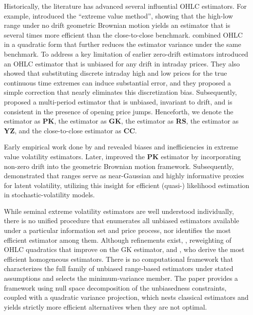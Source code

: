 Historically, the literature has advanced several influential OHLC estimators. For example, \citet{parkinson1980ExtremeValueMethod} introduced the “extreme value method”, showing that the high-low range under no drift geometric Brownian motion yields an estimator that is several times more efficient than the close-to-close benchmark. \citet{garman1980EstimationSecurityPrice} combined OHLC in a quadratic form that further reduces the estimator variance under the same benchmark. To address a key limitation of earlier zero-drift estimators \citet{rogers1991EstimatingVarianceHigh} introduced an OHLC estimator that is unbiased for any drift in intraday prices. They also showed that substituting discrete intraday high and low prices for the true continuous time extremes can induce substantial error, and they proposed a simple correction that nearly eliminates this discretization bias. Subsequently, \citet{yang2000DriftIndependentVolatilityEstimation} proposed a multi-period estimator that is unbiased, invariant to drift, and is consistent in the presence of opening price jumps. Henceforth, we denote the \citet{parkinson1980ExtremeValueMethod} estimator as \textbf{PK}, the \citet{garman1980EstimationSecurityPrice} estimator as \textbf{GK}, the \citet{rogers1991EstimatingVarianceHigh} estimator as \textbf{RS}, the \citet{yang2000DriftIndependentVolatilityEstimation} estimator as \textbf{YZ}, and the close-to-close estimator as \textbf{CC}.

Early empirical work done by \citet{beckers1983VariancesSecurityPrice} and \citet{wiggins1991EmpiricalTestsBias} revealed biases and inefficiencies in extreme value volatility estimators.  Later, \citet{kunitomo1992ImprovingParkinsonMethod} improved the \textbf{PK} estimator by incorporating non-zero drift into the geometric Brownian motion framework. Subsequently, \citet{alizadeh2002RangeBasedEstimationStochastica} demonstrated that ranges serve as  near-Gaussian and highly informative proxies for latent volatility, utilizing this insight  for efficient (quasi-) likelihood estimation in stochastic-volatility models. 

While seminal extreme volatility estimators are well understood individually, there is no unified procedure that enumerates all unbiased estimators available under a particular information set and price process, nor identifies the most efficient estimator among them. Although refinements exist, \citet{meilijson2009GarmanKlassVolatilityEstimator}, reweighting of OHLC quadratics that improve on the GK estimator, and \citet{saichev2009MostEfficientHomogeneous}, who derive the most efficient homogeneous estimators. There is no computational framework that characterizes the full family of unbiased range‑based estimators under stated assumptions and selects the minimum‑variance member. The paper provides a framework using null space decomposition of the unbiasedness constraints, coupled with a quadratic variance projection, which nests classical estimators and yields strictly more efficient alternatives when they are not optimal. 

